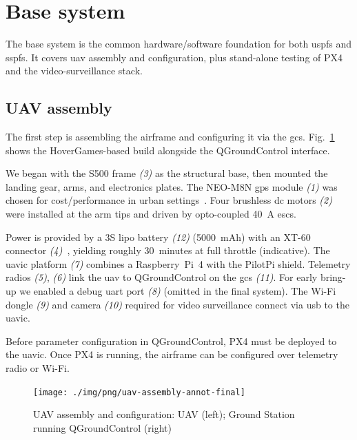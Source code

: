 \section{Base system}
\label{sec:base-system}
The base system is the common hardware/software foundation for both \gls{uspfs}
and \gls{sspfs}. It covers \gls{uav} assembly and configuration, plus
stand-alone testing of PX4 and the video-surveillance stack.

\subsection{UAV assembly}
\label{sec:uav-assembly}
The first step is assembling the airframe and configuring it via the \gls{gcs}.
Fig.~\ref{fig:uav-assembly} shows the HoverGames-based build alongside the
QGroundControl interface.

We began with the S500 frame \emph{(3)} as the structural base, then mounted the
landing gear, arms, and electronics plates. The NEO-M8N \gls{gps} module
\emph{(1)} was chosen for cost/performance in urban settings~\cite{gps-neom8n-product}.
Four brushless \gls{dc} motors \emph{(2)} were installed at the arm tips and
driven by opto-coupled 40~A \glspl{esc}.

Power is provided by a 3S \gls{lipo} battery \emph{(12)} (5000~mAh) with an
XT-60 connector \emph{(4)}~\cite{lipo-3s-uav}, yielding roughly 30~minutes at
full throttle (indicative). The \gls{uavic} platform \emph{(7)} combines a
Raspberry~Pi~4 with the PilotPi shield. Telemetry radios \emph{(5)}, \emph{(6)}
link the \gls{uav} to QGroundControl on the \gls{gcs} \emph{(11)}. For early
bring-up we enabled a debug \gls{uart} port \emph{(8)} (omitted in the final
system). The Wi-Fi dongle \emph{(9)} and camera \emph{(10)} required for video
surveillance connect via \gls{usb} to the \gls{uavic}.

Before parameter configuration in QGroundControl, PX4 must be deployed to the
\gls{uavic}. Once PX4 is running, the airframe can be configured over telemetry
radio or Wi-Fi.

\begin{figure}[!hbt]
  \centering
  \texttt{[image: ./img/png/uav-assembly-annot-final]}
  \caption[UAV assembly and configuration]{UAV assembly and configuration: UAV
    (left); Ground Station running QGroundControl (right)}%
  \label{fig:uav-assembly}
\end{figure}

